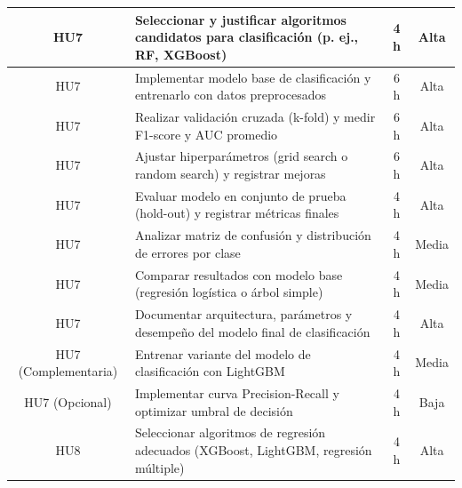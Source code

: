\documentclass[
11pt, %
]{charter}
\begin{document}
\begin{table}[htpb]
\begin{tabularx}{\linewidth}{@{}|c|X|c|c|@{}}
HU7 & Seleccionar y justificar algoritmos candidatos para clasificación (p. ej., RF, XGBoost) & 4 h & Alta \\ \hline
HU7 & Implementar modelo base de clasificación y entrenarlo con datos preprocesados & 6 h & Alta \\ \hline
HU7 & Realizar validación cruzada (k-fold) y medir F1-score y AUC promedio & 6 h & Alta \\ \hline
HU7 & Ajustar hiperparámetros (grid search o random search) y registrar mejoras & 6 h & Alta \\ \hline
HU7 & Evaluar modelo en conjunto de prueba (hold-out) y registrar métricas finales & 4 h & Alta \\ \hline
HU7 & Analizar matriz de confusión y distribución de errores por clase & 4 h & Media \\ \hline
HU7 & Comparar resultados con modelo base (regresión logística o árbol simple) & 4 h & Media \\ \hline
HU7 & Documentar arquitectura, parámetros y desempeño del modelo final de clasificación & 4 h & Alta \\ \hline
HU7 (Complementaria) & Entrenar variante del modelo de clasificación con LightGBM & 4 h & Media \\ \hline
HU7 (Opcional) & Implementar curva Precision-Recall y optimizar umbral de decisión & 4 h & Baja \\ \hline

HU8 & Seleccionar algoritmos de regresión adecuados (XGBoost, LightGBM, regresión múltiple) & 4 h & Alta \\ \hline



\end{tabularx}
\end{table}
\end{document}
